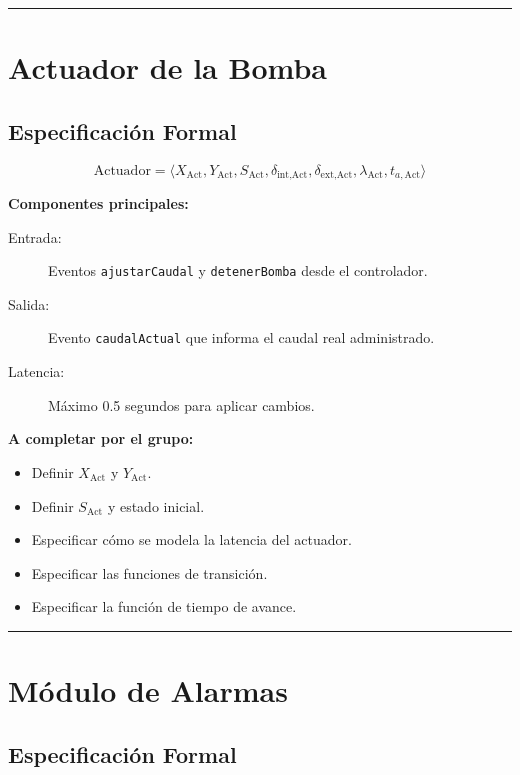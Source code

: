 \documentclass[12pt,a4paper,oneside]{report}
\begin{document}
\noindent\rule{\textwidth}{0.5pt}

\section{Actuador de la Bomba}

\subsection{Especificación Formal}

\[
\text{Actuador} = \langle X_{\text{Act}}, Y_{\text{Act}}, S_{\text{Act}}, \delta_{\text{int},\text{Act}}, \delta_{\text{ext},\text{Act}}, \lambda_{\text{Act}}, t_{a,\text{Act}} \rangle
\]

\textbf{Componentes principales:}

\begin{description}
    \item[Entrada:] Eventos \texttt{ajustarCaudal} y \texttt{detenerBomba} desde el controlador.
    \item[Salida:] Evento \texttt{caudalActual} que informa el caudal real administrado.
    \item[Latencia:] Máximo 0.5 segundos para aplicar cambios.
\end{description}

\textbf{A completar por el grupo:}

\begin{itemize}
    \item Definir $X_{\text{Act}}$ y $Y_{\text{Act}}$.
    \item Definir $S_{\text{Act}}$ y estado inicial.
    \item Especificar cómo se modela la latencia del actuador.
    \item Especificar las funciones de transición.
    \item Especificar la función de tiempo de avance.
\end{itemize}

\noindent\rule{\textwidth}{0.5pt}

\section{Módulo de Alarmas}

\subsection{Especificación Formal}
\end{document}
